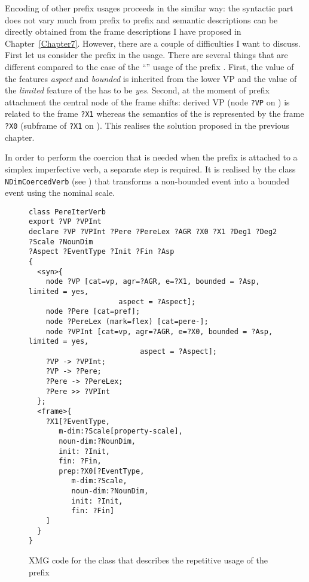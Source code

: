 Encoding of other prefix usages proceeds in the similar way: the syntactic part does not vary much from prefix to prefix and semantic descriptions can be directly obtained from the frame descriptions I have proposed in Chapter~\ref{Chapter7}. However, there are a couple of difficulties I want to discuss. First let us consider the prefix  in the  usage. There are several things that are different compared to the case of the ``'' usage of the prefix . First, the value of the features \textit{aspect} and \textit{bounded} is inherited from the  lower VP and the value of the \textit{limited} feature of the  has to be \textit{yes}. Second, at the moment of prefix attachment the central node of the frame shifts: derived VP (node \texttt{?VP} on ) is related to the frame \texttt{?X1} whereas the semantics of the  is represented by the frame \texttt{?X0} (subframe of \texttt{?X1} on ). This realises the solution proposed in the previous chapter.

In order to perform the coercion that is needed when the prefix  is attached to a simplex imperfective verb, a separate step is required. It is realised by the class \texttt{NDimCoercedVerb} (see ) that transforms a non-bounded event into a bounded event using the nominal scale.\pagebreak

\begin{figure}
\begin{lstlisting}[style=xmg]
class PereIterVerb
export ?VP ?VPInt 
declare ?VP ?VPInt ?Pere ?PereLex ?AGR ?X0 ?X1 ?Deg1 ?Deg2 ?Scale ?NounDim
?Aspect ?EventType ?Init ?Fin ?Asp
{
  <syn>{
    node ?VP [cat=vp, agr=?AGR, e=?X1, bounded = ?Asp, limited = yes, 
    				 aspect = ?Aspect];
    node ?Pere [cat=pref];
    node ?PereLex (mark=flex) [cat=pere-];
    node ?VPInt [cat=vp, agr=?AGR, e=?X0, bounded = ?Asp, limited = yes, 
    					  aspect = ?Aspect];
    ?VP -> ?VPInt;
    ?VP -> ?Pere;
    ?Pere -> ?PereLex;
    ?Pere >> ?VPInt
  };
  <frame>{
    ?X1[?EventType,
       m-dim:?Scale[property-scale],
       noun-dim:?NounDim,
       init: ?Init,
       fin: ?Fin,
       prep:?X0[?EventType,
          m-dim:?Scale,
          noun-dim:?NounDim,
          init: ?Init,
          fin: ?Fin]
    ]
  }
}
\end{lstlisting}
\caption{XMG code for the class that describes the repetitive usage of the prefix \label{code:pere}}
\end{figure}

